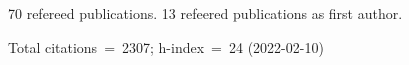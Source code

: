 70 refereed publications. 13 refeered publications as first author.

Total citations~=~2307; h-index~=~24 (2022-02-10)